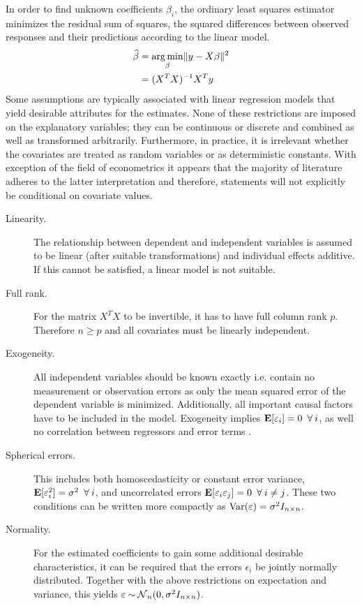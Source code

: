 In order to find unknown coefficients $\beta_i$, the ordinary least squares estimator minimizes the residual sum of squares, the squared differences between observed responses and their predictions according to the linear model.
\begin{subequations}
\begin{align}
  \widehat{\beta} &= \operatorname*{arg\, min}_{\beta} \lVert y - X \beta\rVert^2 \\
         &= (X^T X)^{-1} X^T y \label{eq:ols-estimate}
\end{align}
\end{subequations}
Some assumptions are typically associated with linear regression models that yield desirable attributes for the estimates. None of these restrictions are imposed on the explanatory variables; they can be continuous or discrete and combined as well as transformed arbitrarily. Furthermore, in practice, it is irrelevant whether the covariates are treated as random variables or as deterministic constants. With exception of the field of econometrics it appears that the majority of literature adheres to the latter interpretation and therefore, statements will not explicitly be conditional on covariate values.
\begin{description}
  \item[Linearity.] The relationship between dependent and independent variables is assumed to be linear (after suitable transformations) and individual effects additive. If this cannot be satisfied, a linear model is not suitable.
  \item[Full rank.] For the matrix $X^T X$ to be invertible, it has to have full column rank $p$. Therefore $n \geq p$ and all covariates must be linearly independent.
  \item[Exogeneity.] All independent variables should be known exactly i.e. contain no measurement or observation errors as only the mean squared error of the dependent variable is minimized. Additionally, all important causal factors have to be included in the model. Exogeneity implies $\Erw[\epsilon_i] = 0 \forall i$, as well no correlation between regressors and error terms \citep{Hayashi2000}.
  \item[Spherical errors.] This includes both homoscedasticity or constant error variance, $\Erw[\epsilon_i^2] = \sigma^2 \forall i$, and uncorrelated errors $\Erw[\epsilon_i \epsilon_j] = 0 \forall i \neq j$. These two conditions can be written more compactly as $\operatorname{Var}(\varepsilon) = \sigma^2I_{n \times n}$.
  \item[Normality.] For the estimated coefficients to gain some additional desirable characteristics, it can be required that the errors $\epsilon_i$ be jointly normally distributed. Together with the above restrictions on expectation and variance, this yields $\varepsilon \mathbin{\sim} \operatorname{\mathcal{N}}_n(0, \sigma^2 I_{n \times n})$.
\end{description}

